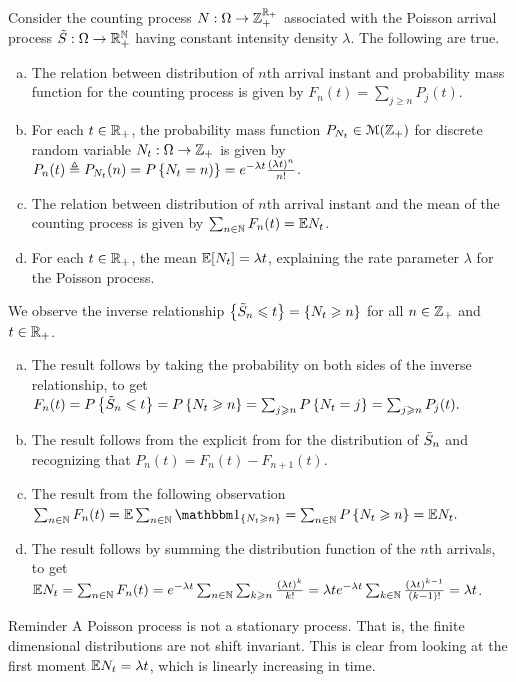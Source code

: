 \documentclass[12pt,aspectratio=169]{beamer}
\begin{document}
\begin{frame}
\begin{cor} 
Consider the counting process $N:\Omega\to\mathbb{Z}_+^{\mathbb{R}_+}$ associated with the Poisson arrival process $\tilde{S}:\Omega\to\mathbb{R}_+^{\mathbb{N}}$ having constant intensity density $\lambda$. 
The following are true.
\begin{enumerate}[(a)]
\item<2-> The relation between distribution of $n$th arrival instant and probability mass function for the counting process is given by  $F_n(t)= \sum_{j \ge n}P_j(t)$. 
\item<3-> For each $t\in\mathbb{R}_+$, the probability mass function $P_{N_t}\in\mathcal{M}(\mathbb{Z}_+)$ for discrete random variable $N_t:\Omega\to\mathbb{Z}_+$ is given by $P_n(t) \triangleq P_{N_t}(n) = P\left\{N_t=n)\right\}= e^{-\lambda t}\frac{(\lambda t)^{n}}{n!}$. 
\item<4->  The relation between distribution of $n$th arrival instant and the mean of the counting process is given by $\sum_{n \in \mathbb{N}}F_n(t) = \mathbb{E} N_t$. 
\item<5-> For each $t\in\mathbb{R}_+$, the mean  $\mathbb{E}[N_t] = \lambda t$, explaining the rate parameter $\lambda$ for the Poisson process. 
\end{enumerate}
\end{cor}
\end{frame}

\begin{frame}
\begin{Proof}
We observe the inverse relationship $\left\{\tilde{S}_n \leqslant t\right\} = \left\{N_t \geqslant n\right\}$ for all $n \in \mathbb{Z}_+$ and $t\in\mathbb{R}_+$.  
\begin{enumerate}[(a)]
\item<2-> The result follows by taking the probability on both sides of the inverse relationship, to get  
$
F_n(t)  
= P\left\{\tilde{S}_n \leqslant t\right\} 
= P\left\{N_t \geqslant n\right\}  
= \sum_{j \geqslant n}P\left\{N_t = j\right\}
= \sum_{j \geqslant n}P_j(t).
$
\item<3-> The result follows from the explicit from for the distribution of $\tilde{S}_n$ and recognizing that $P_n(t) = F_n(t) - F_{n+1}(t)$. 
\item<4-> The result from the following observation
$
\sum_{n \in \N}F_n(t) = \E\sum_{n \in \N}\SetIn{N_t \ge n} = \sum_{n \in \N}P\set{N_t \ge n} = \E N_t.
$
\item<5-> The result follows by summing the distribution function of the $n$th arrivals, to get 
$\mathbb{E} N_t = \sum_{n\in\mathbb{N}}F_n(t) = e^{-\lambda t}\sum_{n\in\mathbb{N}}\sum_{k \geqslant n}\frac{(\lambda t)^k}{k!} = 
\lambda t e^{-\lambda t}\sum_{k\in\mathbb{N}}\frac{(\lambda t)^{k-1}}{(k-1)!} = \lambda t$. 
\end{enumerate}
\end{Proof}
\end{frame}

\begin{frame}
\begin{block}{Reminder} 
A Poisson process is not a stationary process. 
That is, the finite dimensional distributions are not shift invariant. 
This is clear from looking at the first moment $\mathbb{E} N_t = \lambda t$, which is linearly increasing in time. 
\end{block}
\end{frame}
\end{document}
